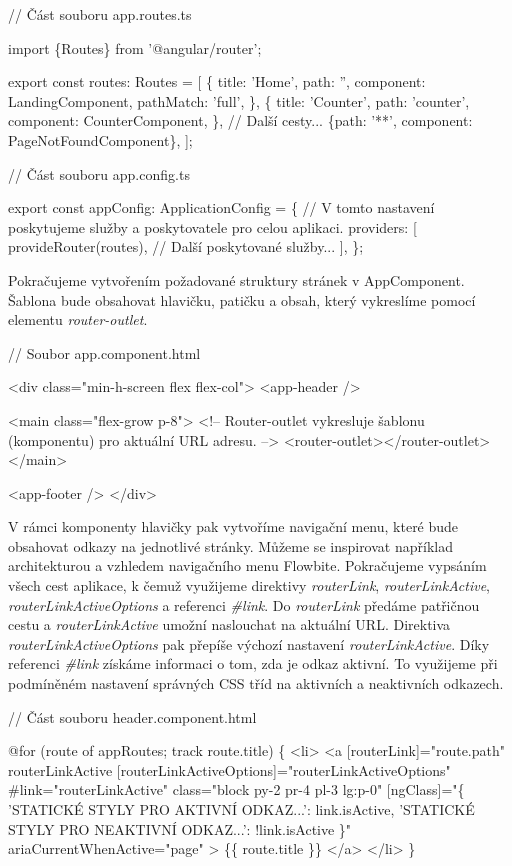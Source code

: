 \begin{prog}
// Část souboru app.routes.ts

import \{Routes\} from '@angular/router';

export const routes: Routes = [
  \{
    title: 'Home',
    path: '',
    component: LandingComponent,
    pathMatch: 'full',
  \},
  \{
    title: 'Counter',
    path: 'counter',
    component: CounterComponent,
  \},
  // Další cesty...
  \{path: '**', component: PageNotFoundComponent\},
];

// Část souboru app.config.ts

export const appConfig: ApplicationConfig = \{
  // V tomto nastavení poskytujeme služby a poskytovatele pro celou aplikaci.
  providers: [
    provideRouter(routes),
    // Další poskytované služby...
  ],
\};
\end{prog}

Pokračujeme vytvořením požadované struktury stránek v AppComponent. Šablona bude obsahovat hlavičku, patičku a obsah, který vykreslíme pomocí elementu \emph{router-outlet}. 

\begin{prog}
// Soubor app.component.html

<div class="min-h-screen flex flex-col">
  <app-header />

  <main class="flex-grow p-8">
    <!-- Router-outlet vykresluje šablonu (komponentu) pro aktuální URL adresu. -->
    <router-outlet></router-outlet>
  </main>

  <app-footer />
</div>
\end{prog}

V rámci komponenty hlavičky pak vytvoříme navigační menu, které bude obsahovat odkazy na jednotlivé stránky. 
Můžeme se inspirovat například architekturou a vzhledem navigačního menu Flowbite. 
Pokračujeme vypsáním všech cest aplikace, k čemuž využijeme direktivy \emph{routerLink}, \emph{routerLinkActive}, \emph{routerLinkActiveOptions} a referenci \emph{\#link}. 
Do \emph{routerLink} předáme patřičnou cestu a \emph{routerLinkActive} umožní naslouchat na aktuální URL. Direktiva \emph{routerLinkActiveOptions} pak přepíše výchozí nastavení \emph{routerLinkActive}.
Díky referenci \emph{\#link} získáme informaci o tom, zda je odkaz aktivní. To využijeme při podmíněném nastavení správných CSS tříd na aktivních a neaktivních odkazech.

\begin{prog}
// Část souboru header.component.html

@for (route of appRoutes; track route.title) \{
  <li>
    <a
      [routerLink]="route.path"
      routerLinkActive
      [routerLinkActiveOptions]="routerLinkActiveOptions"
      #link="routerLinkActive"
      class="block py-2 pr-4 pl-3 lg:p-0"
      [ngClass]="\{
        'STATICKÉ STYLY PRO AKTIVNÍ ODKAZ...': link.isActive,
        'STATICKÉ STYLY PRO NEAKTIVNÍ ODKAZ...': !link.isActive
      \}"
      ariaCurrentWhenActive="page"
    >
      \{\{ route.title \}\}
    </a>
  </li>
\}
\end{prog}

